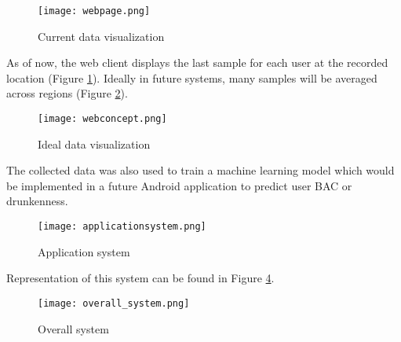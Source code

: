 \begin{figure}[H]
	\centering
	\texttt{[image: webpage.png]}
	\caption{Current data visualization}
	\label{webpage}
\end{figure}

As of now, the web client displays the last sample for each user at the recorded location (Figure \ref{webpage}). Ideally in future systems, many samples will be averaged across regions (Figure \ref{concept}). 

\begin{figure}[H]
	\centering
	\texttt{[image: webconcept.png]}
	\caption{Ideal data visualization}
	\label{concept}
\end{figure}

The collected data was also used to train a machine learning model which would be implemented in a future Android application to predict user BAC or drunkenness. 

\begin{figure}[H]
	\centering
	\texttt{[image: applicationsystem.png]}
	\caption{Application system}
	\label{appsystem}
\end{figure}

Representation of this system can be found in Figure \ref{overallsystem}.

\begin{figure}[H]
	\centering
	\texttt{[image: overall\_system.png]}
	\caption{Overall system}
	\label{overallsystem}
\end{figure}
